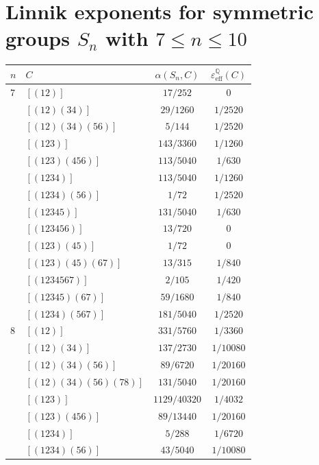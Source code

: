 \documentclass[12pt]{amsart}
\theoremstyle{definition} \newtheorem{definition}[theorem]{Definition}
\theoremstyle{example} \newtheorem{example}[theorem]{Example}
\theoremstyle{remark} \newtheorem{remark}{Remark}[theorem]
\numberwithin{equation}{section}
\numberwithin{theorem}{section}
\renewcommand{\epsilon}{\varepsilon}
\renewcommand{\leq}{\leqslant}
\begin{document}
	
\clearpage
\appendix

\section{Linnik exponents for symmetric groups $S_n$ with $7 \leq n \leq 10$}
	\label{sec:appendix-Sn}

	{\tiny
	\begin{table}[h]
		\begin{minipage}[t]{0.45\textwidth}
		\begin{tabular}{|l|l|c|c|} \hline
			$n$ & $C$ & $\alpha(S_n,C)$ & $\epsilon_\mathrm{eff}^\mathbb{Q}(C)$ \\ \hline
				$7$ & $[(12)]$ & $17/252$ & $0$ \\
					& $[(12)(34)]$ & $29/1260$ & $1/2520$ \\
					& $[(12)(34)(56)]$ & $5/144$ & $1/2520$ \\
					& $[(123)]$ & $143/3360$ & $1/1260$ \\
					& $[(123)(456)]$ & $113/5040$ & $1/630$ \\
					& $[(1234)]$ & $113/5040$ & $1/1260$ \\
					& $[(1234)(56)]$ & $1/72$ & $1/2520$ \\
					& $[(12345)]$ & $131/5040$ & $1/630$ \\
					& $[(123456)]$ & $13/720$ & $0$ \\
					& $[(123)(45)]$ & $1/72$ & $0$ \\
					& $[(123)(45)(67)]$ & $13/315$ & $1/840$ \\
					& $[(1234567)]$ & $2/105$ & $1/420$ \\
					& $[(12345)(67)]$ & $59/1680$ & $1/840$ \\
					& $[(1234)(567)]$ &$181/5040$ & $1/2520$ \\
					\hline
				$8$ & $[(12)]$ & $331/5760$ & $1/3360$ \\
					& $[(12)(34)]$ & $137/2730$ & $1/10080$ \\
					& $[(12)(34)(56)]$ & $89/6720$ & $1/20160$ \\
					& $[(12)(34)(56)(78)]$ & $131/5040$ & $1/20160$ \\
					& $[(123)]$ & $1129/40320$ & $1/4032$ \\
					& $[(123)(456)]$ & $89/13440$ & $1/20160$ \\
					& $[(1234)]$ & $5/288$ & $1/6720$ \\
					& $[(1234)(56)]$ & $43/5040$& $1/10080$ \\

\end{tabular}
\end{minipage}
\end{table}}
\end{document}
